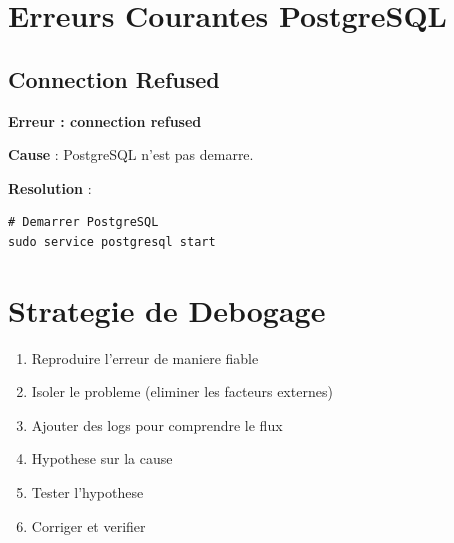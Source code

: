 \documentclass[a4paper,12pt]{book}
\begin{document}



\section{Erreurs Courantes PostgreSQL}

\subsection{Connection Refused}

\begin{errorbox}
    \textbf{Erreur : connection refused}

    \textbf{Cause} : PostgreSQL n'est pas demarre.

    \textbf{Resolution} :
    \begin{lstlisting}[style=bash]
# Demarrer PostgreSQL
sudo service postgresql start
    \end{lstlisting}
\end{errorbox}





\section{Strategie de Debogage}

\begin{enumerate}
    \item Reproduire l'erreur de maniere fiable
    \item Isoler le probleme (eliminer les facteurs externes)
    \item Ajouter des logs pour comprendre le flux
    \item Hypothese sur la cause
    \item Tester l'hypothese
    \item Corriger et verifier
\end{enumerate}
\end{document}
